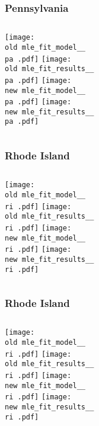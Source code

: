 \documentclass{beamer}
\newcommand{\old}{api-370-prod/pyseir/state_summaries/reports/}
\newcommand{\new}{new/pyseir/state_summaries/reports/}
\newcommand{\pa}{Pennsylvania__42}
\newcommand{\ri}{Rhode Island__44}
\begin{document}
\begin{frame}
\frametitle{Pennsylvania}
    \begin{columns}[t]
       \texttt{[image: \\old mle\_fit\_model\_\_\\pa .pdf]}
       \texttt{[image: \\old mle\_fit\_results\_\_\\pa .pdf]}   
       \texttt{[image: \\new mle\_fit\_model\_\_\\pa .pdf]}
       \texttt{[image: \\new mle\_fit\_results\_\_\\pa .pdf]}   
\end{columns}
\end{frame}

\begin{frame}
\frametitle{Rhode Island}
    \begin{columns}[t]
       \texttt{[image: \\old mle\_fit\_model\_\_\\ri .pdf]}
       \texttt{[image: \\old mle\_fit\_results\_\_\\ri .pdf]}   
       \texttt{[image: \\new mle\_fit\_model\_\_\\ri .pdf]}
       \texttt{[image: \\new mle\_fit\_results\_\_\\ri .pdf]}   
\end{columns}
\end{frame}

\begin{frame}
\frametitle{Rhode Island}
    \begin{columns}[t]
       \texttt{[image: \\old mle\_fit\_model\_\_\\ri .pdf]}
       \texttt{[image: \\old mle\_fit\_results\_\_\\ri .pdf]}   
       \texttt{[image: \\new mle\_fit\_model\_\_\\ri .pdf]}
       \texttt{[image: \\new mle\_fit\_results\_\_\\ri .pdf]}   
\end{columns}
\end{frame}
\end{document}
